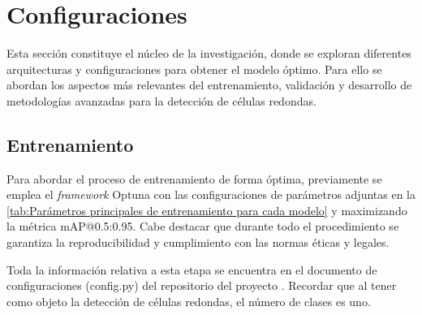 \documentclass[12pt,a4paper,onecolumn,oneside]{report}
\begin{document}
\section{Configuraciones}
\label{sec:Configuraciones}

Esta sección constituye el núcleo de la investigación, donde se exploran diferentes arquitecturas y configuraciones para obtener el modelo óptimo.
Para ello se abordan los aspectos más relevantes del entrenamiento, validación y desarrollo de metodologías avanzadas para la detección de células redondas.

\subsection{Entrenamiento}
\label{sec:Entrenamiento}

Para abordar el proceso de entrenamiento de forma óptima, previamente se emplea el \textit{framework} Optuna \cite{Optuna} con las configuraciones de parámetros adjuntas en la \autoref{tab:Parámetros principales de entrenamiento para cada modelo} y
maximizando la métrica mAP@0.5:0.95. Cabe destacar que durante todo el procedimiento se garantiza la reproducibilidad y cumplimiento con las normas éticas y legales.

Toda la información relativa a esta etapa se encuentra en el documento de configuraciones (config.py) del repositorio
del proyecto \cite{repoTFM}. Recordar que al tener como objeto la detección de células redondas, el número de clases es uno.
\end{document}
